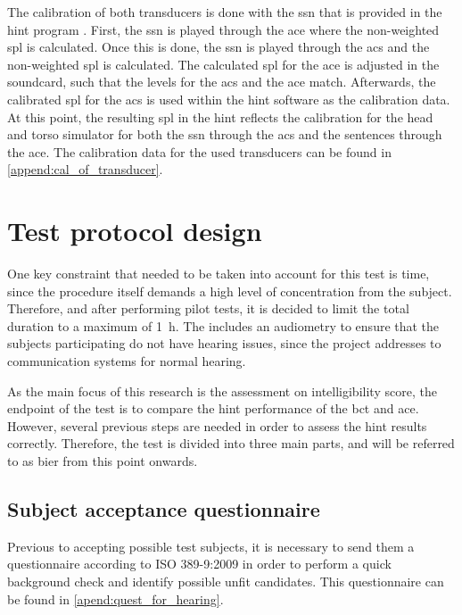The calibration of both transducers is done with the \gls{ssn} that is provided in the \gls{hint} program \citep{nilsson_95}. First, the \gls{ssn} is played through the \gls{ace} where the non-weighted \gls{spl} is calculated. Once this is done, the \gls{ssn} is played through the \gls{acs} and the non-weighted \gls{spl} is calculated. The calculated \gls{spl} for the \gls{ace} is adjusted in the soundcard, such that the levels for the \gls{acs} and the \gls{ace} match. Afterwards, the calibrated \gls{spl} for the \gls{acs} is used within the \gls{hint} software as the calibration data. At this point, the resulting \gls{spl}  in the \gls{hint} reflects the calibration for the head and torso simulator for both the \gls{ssn} through the \gls{acs} and the sentences through the \gls{ace}. The calibration data for the used transducers can be found in \autoref{append:cal_of_transducer}.
   
   
   
\section{Test protocol design}
\label{sec:test_protocol_design}   
One key constraint that needed to be taken into account for this test is time, since the procedure itself demands a high level of concentration from the subject. Therefore, and after performing pilot tests, it is decided to limit the total duration to a maximum of \SI{1}{\hour}. The includes an audiometry to ensure that the subjects participating do not have hearing issues, since the project addresses to communication systems for normal hearing.
 
As the main focus of this research is the assessment on intelligibility score, the endpoint of the test is to compare the \gls{hint} performance of the \gls{bct} and \gls{ace}. However, several previous steps are needed in order to assess the \gls{hint} results correctly. Therefore, the test is divided into three main parts, and will be referred to as \gls{bier} from this point onwards. 
 
 
 
\subsection{Subject acceptance questionnaire}
Previous to accepting possible test subjects, it is necessary to send them a questionnaire according to ISO 389-9:2009 \citep{iso_389-9} in order to perform a quick background check and identify possible unfit candidates. This questionnaire can be found in \autoref{apend:quest_for_hearing}.
  
